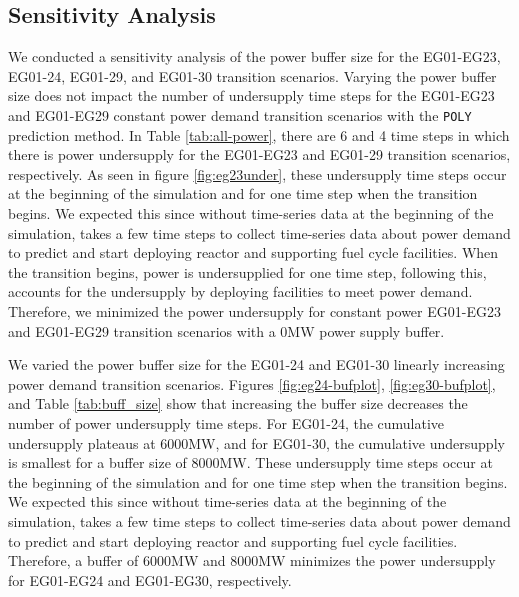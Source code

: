 \subsection{Sensitivity Analysis}
We conducted a sensitivity analysis of the power buffer size for the
EG01-EG23, EG01-24, EG01-29, and EG01-30 transition scenarios. 
Varying the power buffer size does not impact the number of 
undersupply time steps for the EG01-EG23 and EG01-EG29 constant 
power demand transition scenarios with the \texttt{POLY} prediction method.
In Table \ref{tab:all-power}, there are 6 and 4 time steps
in which there is power undersupply for the EG01-EG23 and EG01-29 
transition scenarios, respectively. 
As seen in figure \ref{fig:eg23under}, these undersupply time 
steps occur at the beginning of the simulation and for one 
time step when the transition begins. 
We expected this since without time-series data 
at the beginning of the simulation, \deploy takes a few 
time steps to collect time-series data about power demand 
to predict and start deploying reactor and supporting 
fuel cycle facilities. 
When the transition begins, power is undersupplied for one 
time step, following this, \deploy accounts for the 
undersupply by deploying facilities to meet power demand.
Therefore, we minimized the power undersupply for constant 
power EG01-EG23 and EG01-EG29 transition scenarios with 
a 0MW power supply buffer. 

We varied the power buffer size for the EG01-24 and EG01-30 
linearly increasing power demand transition scenarios. 
Figures \ref{fig:eg24-bufplot}, \ref{fig:eg30-bufplot}, 
and Table \ref{tab:buff_size} 
show that increasing the buffer size decreases the number of 
power undersupply time steps. 
For EG01-24, the cumulative undersupply plateaus at 6000MW, 
and for EG01-30, the cumulative undersupply is smallest 
for a buffer size of 8000MW.
These undersupply time 
steps occur at the beginning of the simulation and for one 
time step when the transition begins. 
We expected this since without time-series data 
at the beginning of the simulation, \deploy takes a few 
time steps to collect time-series data about power demand 
to predict and start deploying reactor and supporting 
fuel cycle facilities. 
Therefore, a buffer of 6000MW and 8000MW minimizes 
the power undersupply for EG01-EG24 and EG01-EG30, respectively.

